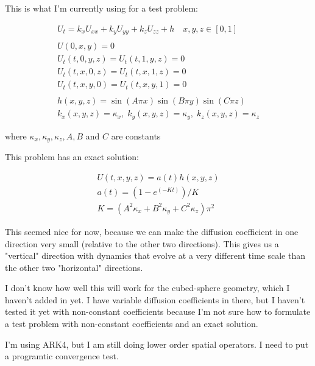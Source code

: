 \documentclass[final,letterpaper,11pt]{report}
\begin{document}
This is what I'm currently using for a test problem:

\begin{align*}
&U_t = k_xU_{xx} + k_yU_{yy} + k_zU_{zz} + h \quad x,y,z \in [0,1] &\\
&\\
&U(0,x,y) = 0 &\\
&U_t(t,0,y,z) = U_t(t,1,y,z) = 0 &\\
&U_t(t,x,0,z) = U_t(t,x,1,z) = 0 &\\
&U_t(t,x,y,0) = U_t(t,x,y,1) = 0 &\\
&&\\
&h(x,y,z) = \sin(A \pi x) \sin(B \pi y) \sin(C \pi z)&\\
&k_x(x,y,z) = \kappa_x, \; k_y(x,y,z) = \kappa_y, \; k_z(x,y,z) = \kappa_z& 
\end{align*}

where $\kappa_x, \kappa_y, \kappa_z, A, B$ and $C$ are constants

This problem has an exact solution:

\begin{align*}
&U(t,x,y,z) = a(t) h(x,y,z) &\\
&a(t) = (1 - e^{(-Kt)}) / K &\\
&K = (A^2\kappa_x + B^2\kappa_y + C^2\kappa_z)\pi^2&
\end{align*}

This seemed nice for now, because we can make the diffusion coefficient in one
direction very small (relative to the other two directions). This gives us a
"vertical" direction with dynamics that evolve at a very different time scale
than the other two "horizontal" directions.

I don't know how well this will work for the cubed-sphere geometry, which I
haven't added in yet. I have variable diffusion coefficients in there, but I haven't tested
it yet with non-constant coefficients because I'm not sure how to formulate a test
problem with non-constant coefficients and an exact solution.

I'm using ARK4, but I am still doing lower order spatial operators. I need to
put a programtic convergence test.
\end{document}
